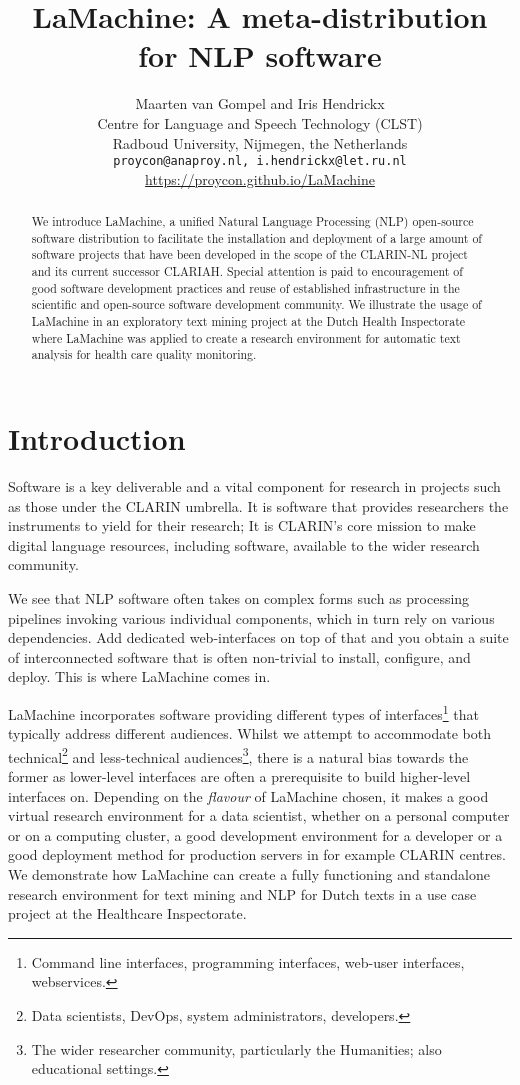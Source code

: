 \documentclass[a4paper,11pt]{article}
\title{LaMachine: A meta-distribution for NLP software}
\author{Maarten van Gompel  and Iris Hendrickx\\
  Centre for Language and Speech Technology (CLST) \\
  Radboud University, Nijmegen, the Netherlands \\
  {\tt proycon@anaproy.nl, i.hendrickx@let.ru.nl} \\ %
  \url{https://proycon.github.io/LaMachine}
}
\date{}
\begin{document}
\maketitle

\begin{abstract}
We introduce LaMachine, a unified Natural Language Processing (NLP) open-source software distribution to facilitate the
installation and deployment of a large amount of software projects that have been developed in the scope of the
CLARIN-NL project and its current successor CLARIAH. Special attention is paid to encouragement of good software
development practices and reuse of established infrastructure in the scientific and open-source software development
community. We illustrate the usage of LaMachine in an exploratory text mining project at the Dutch Health Inspectorate where LaMachine was applied to create a research environment for automatic text analysis for health care quality monitoring.
\end{abstract}

\section{Introduction} \label{intro}

Software is a key deliverable and a vital component for research in projects such as those under the CLARIN umbrella. It
is software that provides researchers the instruments to yield for their research;
It is CLARIN's core mission to make digital language resources,
including software, available to the wider research community.

We see that NLP software often takes on complex forms such as processing pipelines invoking various individual
components, which in turn rely on various dependencies. Add dedicated web-interfaces on top of that and you obtain a
suite of interconnected software that is often non-trivial to install, configure, and deploy. This is where LaMachine
comes in.

LaMachine incorporates software providing different types of interfaces\footnote{Command line interfaces, programming
interfaces, web-user interfaces, webservices.} that typically address different audiences. Whilst we attempt to
accommodate both technical\footnote{Data scientists, DevOps, system administrators, developers.} and less-technical
audiences\footnote{The wider researcher community, particularly the Humanities; also educational settings.}, there is a natural bias towards the former as
lower-level interfaces are often a prerequisite to build higher-level interfaces on. Depending on the \emph{flavour} of
LaMachine chosen, it makes a good virtual research environment for a data scientist, whether on a personal computer or on a computing
cluster, a good development environment for a developer or a good deployment method for production servers in for
example CLARIN centres.
We demonstrate how LaMachine can create a fully functioning and standalone research environment for text mining  and NLP for Dutch texts in a use case project at the Healthcare Inspectorate.
\end{document}
